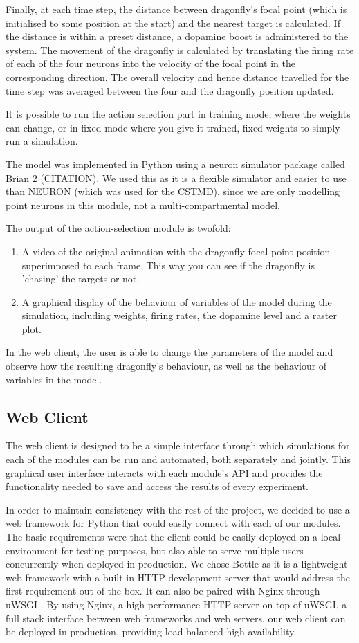 \documentclass[a4paper,11pt]{article}
\begin{document}
Finally, at each time step, the distance between dragonfly's focal point (which is initialised to some position at the start) and the nearest target is calculated. If the distance is within a preset distance, a dopamine boost is administered to the system. The movement of the dragonfly is calculated by translating the firing rate of each of the four neurons into the velocity of the focal point in the corresponding direction. The overall velocity and hence distance travelled for the time step was averaged between the four and the dragonfly position updated. 

It is possible to run the action selection part in training mode, where the weights can change, or in fixed mode where you give it trained, fixed weights to simply run a simulation. 

The model was implemented in Python using a neuron simulator package called Brian 2 (CITATION). We used this as it is a flexible simulator and easier to use than NEURON (which was used for the CSTMD), since we are only modelling point neurons in this module, not a multi-compartmental model. 

The output of the action-selection module is twofold:
\begin{enumerate}
\item A video of the original animation with the dragonfly focal point position superimposed to each frame. This way you can see if the dragonfly is 'chasing' the targets or not.
\item A graphical display of the behaviour of variables of the model during the simulation, including weights, firing rates, the dopamine level and a raster plot.
\end{enumerate}
In the web client, the user is able to change the parameters of the model and observe how the resulting dragonfly's behaviour, as well as the behaviour of variables in the model.

\subsection{Web Client}
The web client is designed to be a simple interface through which simulations for each of the modules can be run and automated, both separately and jointly. This graphical user interface interacts with each module's API and provides the functionality needed to save and access the results of every experiment.

In order to maintain consistency with the rest of the project, we decided to use a web framework for Python that could easily connect with each of our modules. The basic requirements were that the client could be easily deployed on a local environment for testing purposes, but also able to serve multiple users concurrently when deployed in production. We chose Bottle \cite{bottle} as it is a lightweight web framework with a built-in HTTP development server that would address the first requirement out-of-the-box. It can also be paired with Nginx \cite{nginx} through uWSGI \cite{uwsgi}. By using Nginx, a high-performance HTTP server on top of uWSGI, a full stack interface between web frameworks and web servers, our web client can be deployed in production, providing load-balanced high-availability.
\end{document}
